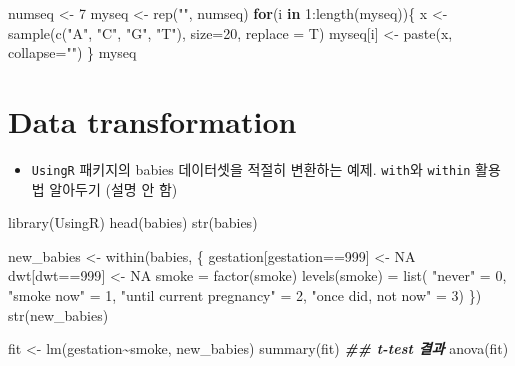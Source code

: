 \documentclass[
]{book}
\newenvironment{Shaded}{\begin{snugshade}}{\end{snugshade}}
\newcommand{\AttributeTok}[1]{\textcolor[rgb]{0.77,0.63,0.00}{#1}}
\newcommand{\ConstantTok}[1]{\textcolor[rgb]{0.00,0.00,0.00}{#1}}
\newcommand{\ControlFlowTok}[1]{\textcolor[rgb]{0.13,0.29,0.53}{\textbf{#1}}}
\newcommand{\DecValTok}[1]{\textcolor[rgb]{0.00,0.00,0.81}{#1}}
\newcommand{\DocumentationTok}[1]{\textcolor[rgb]{0.56,0.35,0.01}{\textbf{\textit{#1}}}}
\newcommand{\FunctionTok}[1]{\textcolor[rgb]{0.00,0.00,0.00}{#1}}
\newcommand{\NormalTok}[1]{#1}
\newcommand{\OtherTok}[1]{\textcolor[rgb]{0.56,0.35,0.01}{#1}}
\newcommand{\SpecialCharTok}[1]{\textcolor[rgb]{0.00,0.00,0.00}{#1}}
\newcommand{\StringTok}[1]{\textcolor[rgb]{0.31,0.60,0.02}{#1}}
\providecommand{\tightlist}{%
  \setlength{\itemsep}{0pt}\setlength{\parskip}{0pt}}
\begin{document}
\begin{Shaded}
\begin{Highlighting}[]
\NormalTok{numseq }\OtherTok{\textless{}{-}} \DecValTok{7}
\NormalTok{myseq }\OtherTok{\textless{}{-}} \FunctionTok{rep}\NormalTok{(}\StringTok{""}\NormalTok{, numseq)}
\ControlFlowTok{for}\NormalTok{(i }\ControlFlowTok{in} \DecValTok{1}\SpecialCharTok{:}\FunctionTok{length}\NormalTok{(myseq))\{}
\NormalTok{  x }\OtherTok{\textless{}{-}} \FunctionTok{sample}\NormalTok{(}\FunctionTok{c}\NormalTok{(}\StringTok{"A"}\NormalTok{, }\StringTok{"C"}\NormalTok{, }\StringTok{"G"}\NormalTok{, }\StringTok{"T"}\NormalTok{), }\AttributeTok{size=}\DecValTok{20}\NormalTok{, }\AttributeTok{replace =}\NormalTok{ T)}
\NormalTok{  myseq[i] }\OtherTok{\textless{}{-}} \FunctionTok{paste}\NormalTok{(x, }\AttributeTok{collapse=}\StringTok{""}\NormalTok{)}
\NormalTok{\}}
\NormalTok{myseq}
\end{Highlighting}
\end{Shaded}

\hypertarget{data-transformation-1}{%
\section{Data transformation}\label{data-transformation-1}}

\begin{itemize}
\tightlist
\item
  \texttt{UsingR} 패키지의 babies 데이터셋을 적절히 변환하는 예제. \texttt{with}와 \texttt{within} 활용법 알아두기 (설명 안 함)
\end{itemize}

\begin{Shaded}
\begin{Highlighting}[]
\FunctionTok{library}\NormalTok{(UsingR)}
\FunctionTok{head}\NormalTok{(babies)}
\FunctionTok{str}\NormalTok{(babies)}


\NormalTok{new\_babies }\OtherTok{\textless{}{-}} \FunctionTok{within}\NormalTok{(babies, \{}
\NormalTok{  gestation[gestation}\SpecialCharTok{==}\DecValTok{999}\NormalTok{] }\OtherTok{\textless{}{-}} \ConstantTok{NA}
\NormalTok{  dwt[dwt}\SpecialCharTok{==}\DecValTok{999}\NormalTok{] }\OtherTok{\textless{}{-}} \ConstantTok{NA}
\NormalTok{  smoke }\OtherTok{=} \FunctionTok{factor}\NormalTok{(smoke)}
  \FunctionTok{levels}\NormalTok{(smoke) }\OtherTok{=} \FunctionTok{list}\NormalTok{(}
    \StringTok{"never"} \OtherTok{=} \DecValTok{0}\NormalTok{, }
    \StringTok{"smoke now"} \OtherTok{=} \DecValTok{1}\NormalTok{, }
    \StringTok{"until current pregnancy"} \OtherTok{=} \DecValTok{2}\NormalTok{,}
    \StringTok{"once did, not now"} \OtherTok{=} \DecValTok{3}\NormalTok{)}
\NormalTok{  \})}
\FunctionTok{str}\NormalTok{(new\_babies)}

\NormalTok{fit }\OtherTok{\textless{}{-}} \FunctionTok{lm}\NormalTok{(gestation}\SpecialCharTok{\textasciitilde{}}\NormalTok{smoke, new\_babies)}
\FunctionTok{summary}\NormalTok{(fit) }\DocumentationTok{\#\# t{-}test 결과 }
\FunctionTok{anova}\NormalTok{(fit)}
\end{Highlighting}
\end{Shaded}
\end{document}
